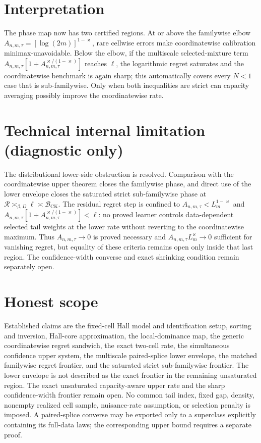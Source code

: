 \documentclass{article}
\begin{document}
\section{Interpretation}

The phase map now has two certified regions. At or above the familywise elbow \(A_{n,m,\tau}=[\log(2m)]^{1-\varkappa}\), rare cellwise errors make coordinatewise calibration minimax-unavoidable. Below the elbow, if the multiscale selected-mixture term \(A_{n,m,\tau}[1+A_{n,m,\tau}^{\varkappa/(1-\varkappa)}]\) reaches \(\ell\), the logarithmic regret saturates and the coordinatewise benchmark is again sharp; this automatically covers every \(N<1\) case that is sub-familywise. Only when both inequalities are strict can capacity averaging possibly improve the coordinatewise rate.

\section*{Technical internal limitation (diagnostic only)}

The distributional lower-side obstruction is resolved. Comparison with the coordinatewise upper theorem closes the familywise phase, and direct use of the lower envelope closes the saturated strict sub-familywise phase at \(\mathcal R\asymp_{\beta,D}\ell\asymp\mathcal B_{\mathrm{CK}}\). The residual regret step is confined to \(A_{n,m,\tau}<L_m^{1-\varkappa}\) and \(A_{n,m,\tau}[1+A_{n,m,\tau}^{\varkappa/(1-\varkappa)}]<\ell\): no proved learner controls data-dependent selected tail weights at the lower rate without reverting to the coordinatewise maximum. Thus \(A_{n,m,\tau}\to0\) is proved necessary and \(A_{n,m,\tau}L_m^{\varkappa}\to0\) sufficient for vanishing regret, but equality of these criteria remains open only inside that last region. The confidence-width converse and exact shrinking condition remain separately open.

\section{Honest scope}

Established claims are the fixed-cell Hall model and identification setup, sorting and inversion, Hall-core approximation, the local-dominance map, the generic coordinatewise regret sandwich, the exact two-cell rate, the simultaneous confidence upper system, the multiscale paired-splice lower envelope, the matched familywise regret frontier, and the saturated strict sub-familywise frontier. The lower envelope is not described as the exact frontier in the remaining unsaturated region. The exact unsaturated capacity-aware upper rate and the sharp confidence-width frontier remain open. No common tail index, fixed gap, density, nonempty realized cell sample, nuisance-rate assumption, or selection penalty is imposed. A paired-splice converse may be exported only to a superclass explicitly containing its full-data laws; the corresponding upper bound requires a separate proof.
\end{document}
